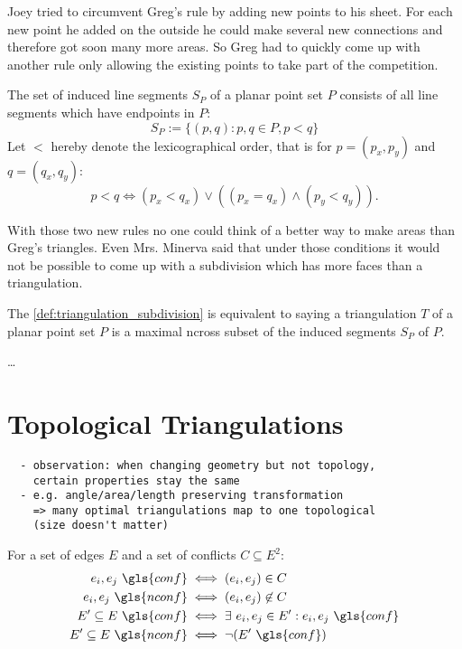 Joey tried to circumvent Greg's rule by adding new points to his
sheet. For each new point he added on the outside he could make
several new connections and therefore got soon many more areas. So
Greg had to quickly come up with another rule only allowing the
existing points to take part of the competition.

\begin{definition}\label{def:induced_segments}
  The set of induced line segments \(S_P\) of a planar point set \(P\)
  consists of all line segments which have endpoints in \(P\):
  \[
    S_P := \{(p,q) : p,q\in P, p < q\}
  \]
  Let \(<\) hereby denote the lexicographical order, that is for
  \(p = (p_x,p_y)\) and \(q = (q_x,q_y)\):
  \[
    p < q \iff (p_x < q_x) \lor ((p_x = q_x) \land (p_y < q_y)).
  \]
\end{definition}

With those two new rules no one could think of a better way to make
areas than Greg's triangles. Even Mrs. Minerva said that under those
conditions it would not be possible to come up with a subdivision
which has more faces than a triangulation.

\begin{definition}[Triangulation]\label{def:triangulation}
  The \cref{def:triangulation_subdivision} is equivalent to saying
  a triangulation \(T\) of a planar point set \(P\) is a maximal
  \gls{ncross} subset of the induced segments \(S_P\) of \(P\).
\end{definition}

\begin{definition}
  \label{def:constrained_triangulation}
  \ldots{}
\end{definition}

\section{Topological Triangulations}

\begin{verbatim}
  - observation: when changing geometry but not topology,
    certain properties stay the same
  - e.g. angle/area/length preserving transformation
    => many optimal triangulations map to one topological
    (size doesn't matter)
\end{verbatim}

\begin{definition}\label{def:conflicting}
  For a set of edges \(E\) and a set of conflicts \(C \subseteq E^2\):
  \begin{alignat*}{1}
    e_i, e_j~\gls{conf} &\iff (e_i, e_j) \in C \\
    e_i, e_j~\gls{nconf} &\iff (e_i, e_j) \not\in C \\
    E' \subseteq E~\gls{conf} &\iff \exists~e_i, e_j \in E' : e_i, e_j~\gls{conf} \\
    E' \subseteq E~\gls{nconf} &\iff \lnot(E'~\gls{conf})
  \end{alignat*}
\end{definition}

